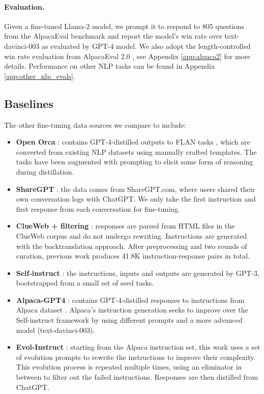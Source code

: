 \paragraph{Evaluation.} Given a fine-tuned Llama-2 model, we prompt it to respond to 805 questions from the AlpacaEval benchmark \cite{alpaca_eval} and report the model's win rate over text-davinci-003 as evaluated by GPT-4 model. We also adopt the length-controlled win rate evaluation from AlpacaEval 2.0 \cite{dubois2024length}, see Appendix \ref{app:alpaca2} for more details. Performance on other NLP tasks can be found in Appendix \ref{app:other_nlp_evals}.

\subsection{Baselines}\label{baselines}
The other fine-tuning data sources we compare to include:
\begin{itemize}[topsep=0pt, itemsep=0pt, leftmargin=8pt, parsep=2pt]
    \item \textbf{Open Orca} \cite{OpenOrca,mukherjee2023orca}: contains GPT-4-distilled outputs to FLAN tasks \cite{longpre2023flan}, which are converted from existing NLP datasets using manually crafted templates. The tasks have been augmented with prompting to elicit some form of reasoning during distillation.
    \item \textbf{ShareGPT} \cite{vicuna2023}: the data comes from ShareGPT.com, where users shared their own conversation logs with ChatGPT. We only take the first instruction and first response from each conversation for fine-tuning.
    \item \textbf{ClueWeb + filtering} \cite{li2023self}: responses are parsed from HTML files in the ClueWeb corpus \cite{overwijk2022clueweb22} and do not undergo rewriting. Instructions are generated with the backtranslation approach. After preprocessing and two rounds of curation, previous work produces 41.8K instruction-response pairs in total.
    \item \textbf{Self-instruct} \cite{wang2022self}: the instructions, inputs and outputs are generated by GPT-3, bootstrapped from a small set of seed tasks.
    \item \textbf{Alpaca-GPT4} \cite{peng2023instruction}: contains GPT-4-distilled responses to instructions from Alpaca dataset \cite{taori2023alpaca}. Alpaca's instruction generation seeks to improve over the Self-instruct framework by using different prompts and a more advanced model (text-davinci-003).
    \item \textbf{Evol-Instruct} \cite{xu2023wizardlm}: starting from the Alpaca instruction set, this work uses a set of evolution prompts to rewrite the instructions to improve their complexity. This evolution process is repeated multiple times, using an eliminator in between to filter out the failed instructions. Responses are then distilled from ChatGPT.
\end{itemize}
